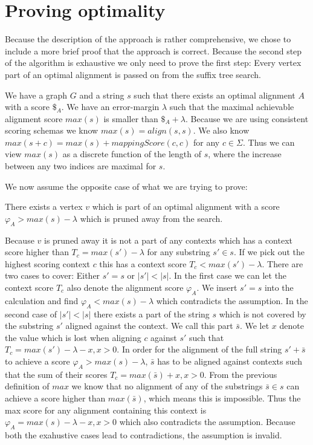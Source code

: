 \documentclass[thesis.tex]{subfiles}
\begin{document}
\chapter{Proving optimality}
\label{sec:proof}
Because the description of the approach is rather comprehensive, we chose to include a more brief proof that the approach is correct. Because the second step of the algorithm is exhaustive we only need to prove the first step: Every vertex part of an optimal alignment is passed on from the suffix tree search.\\
\par\noindent
We have a graph $G$ and a string $s$ such that there exists an optimal alignment $A$ with a score $\$_A$. We have an error-margin $\lambda$ such that the maximal achievable alignment score $max(s)$ is smaller than $\$_A + \lambda$. Because we are using consistent scoring schemas we know $max(s) = align(s, s)$. We also know $max(s+c)=max(s)+mappingScore(c, c)$ for any $c \in \Sigma$. Thus we can view $max(s)$ as a discrete function of the length of $s$, where the increase between any two indices are maximal for $s$.\\
\par\noindent
We now assume the opposite case of what we are trying to prove:
\begin{assumption}
\label{assumption}
There exists a vertex $v$ which is part of an optimal alignment with a score $\varphi_A>max(s)-\lambda$ which is pruned away from the search.
\end{assumption}
\noindent
Because $v$ is pruned away it is not a part of any contexts which has a context score higher than $T_c=max(s')-\lambda$ for any substring $s' \in s$. If we pick out the highest scoring context $c$ this has a context score $T_c<max(s')-\lambda$. There are two cases to cover: Either $s'=s$ or $|s'|<|s|$. In the first case we can let the context score $T_c$ also denote the alignment score $\varphi_A$. We insert $s'=s$ into the calculation and find $\varphi_A<max(s)-\lambda$ which contradicts the assumption. In the second case of $|s'|<|s|$ there exists a part of the string $s$ which is not covered by the substring $s'$ aligned against the context. We call this part $\bar{s}$. We let $x$ denote the value which is lost when aligning $c$ against $s'$ such that $T_c=max(s')-\lambda-x,x>0$. In order for the alignment of the full string $s'+\bar{s}$ to achieve a score $\varphi_A>max(s)-\lambda$, $\bar{s}$ has to be aligned against contexts such that the sum of their scores $T_c=max(\bar{s})+x,x>0$. From the previous definition of $max$ we know that no alignment of any of the substrings $\bar{s} \in s$ can achieve a score higher than $max(\bar{s})$, which means this is impossible. Thus the max score for any alignment containing this context is $\varphi_A=max(s)-\lambda-x,x>0$ which also contradicts the assumption. Because both the exahustive cases lead to contradictions, the assumption is invalid.
\end{document}
